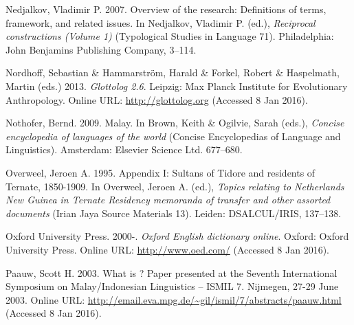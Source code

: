 \begin{styleCitaviBibliographyEntry}
Nedjalkov, Vladimir P. 2007. Overview of the research: Definitions of terms, framework, and related issues. In Nedjalkov, Vladimir P. (ed.), \textit{Reciprocal constructions (Volume 1)} (Typological Studies in Language 71). Philadelphia: John Benjamins Publishing Company, 3–114.
\end{styleCitaviBibliographyEntry}

\begin{styleCitaviBibliographyEntry}
Nordhoff, Sebastian \& Hammarström, Harald \& Forkel, Robert \& Haspelmath, Martin (eds.) 2013. \textit{Glottolog 2.6}. Leipzig: Max Planck Institute for Evolutionary Anthropology. Online URL: \url{http://glottolog.org} (Accessed 8 Jan 2016).
\end{styleCitaviBibliographyEntry}

\begin{styleCitaviBibliographyEntry}
Nothofer, Bernd. 2009. Malay. In Brown, Keith \& Ogilvie, Sarah (eds.), \textit{Concise encyclopedia of languages of the world} (Concise Encyclopedias of Language and Linguistics). Amsterdam: Elsevier Science Ltd. 677–680.
\end{styleCitaviBibliographyEntry}

\begin{styleCitaviBibliographyEntry}
Overweel, Jeroen A. 1995. Appendix I: Sultans of Tidore and residents of Ternate, 1850-1909. In Overweel, Jeroen A. (ed.), \textit{Topics relating to Netherlands New Guinea in Ternate Residency memoranda of transfer and other assorted documents} (Irian Jaya Source Materials 13). Leiden: DSALCUL/IRIS, 137–138.
\end{styleCitaviBibliographyEntry}

\begin{styleCitaviBibliographyEntry}
Oxford University Press. 2000-. \textit{Oxford English dictionary online}. Oxford: Oxford University Press. Online URL: \url{http://www.oed.com/} (Accessed 8 Jan 2016).
\end{styleCitaviBibliographyEntry}

\begin{styleCitaviBibliographyEntry}
Paauw, Scott H. 2003. What is ? Paper presented at the Seventh International Symposium on Malay/Indonesian Linguistics – ISMIL 7. Nijmegen, 27-29 June 2003. Online URL: \url{http://email.eva.mpg.de/~gil/ismil/7/abstracts/paauw.html} (Accessed 8 Jan 2016).
\end{styleCitaviBibliographyEntry}

